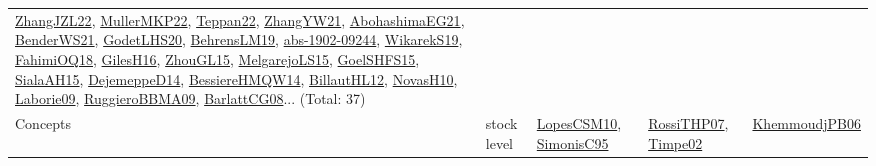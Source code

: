 {\begin{longtable}{lp{3cm}>{\raggedright}p{6cm}>{\raggedright}p{6cm}p{8cm}}
\href{papers/ZhangJZL22.pdf}{ZhangJZL22}\cite{ZhangJZL22}, \href{articles/MullerMKP22.pdf}{MullerMKP22}\cite{MullerMKP22}, \href{papers/Teppan22.pdf}{Teppan22}\cite{Teppan22}, \href{articles/ZhangYW21.pdf}{ZhangYW21}\cite{ZhangYW21}, \href{articles/AbohashimaEG21.pdf}{AbohashimaEG21}\cite{AbohashimaEG21}, \href{papers/BenderWS21.pdf}{BenderWS21}\cite{BenderWS21}, \href{papers/GodetLHS20.pdf}{GodetLHS20}\cite{GodetLHS20}, \href{papers/BehrensLM19.pdf}{BehrensLM19}\cite{BehrensLM19}, \href{articles/abs-1902-09244.pdf}{abs-1902-09244}\cite{abs-1902-09244}, \href{articles/WikarekS19.pdf}{WikarekS19}\cite{WikarekS19}, \href{articles/FahimiOQ18.pdf}{FahimiOQ18}\cite{FahimiOQ18}, \href{papers/GilesH16.pdf}{GilesH16}\cite{GilesH16}, \href{papers/ZhouGL15.pdf}{ZhouGL15}\cite{ZhouGL15}, \href{papers/MelgarejoLS15.pdf}{MelgarejoLS15}\cite{MelgarejoLS15}, \href{articles/GoelSHFS15.pdf}{GoelSHFS15}\cite{GoelSHFS15}, \href{papers/SialaAH15.pdf}{SialaAH15}\cite{SialaAH15}, \href{papers/DejemeppeD14.pdf}{DejemeppeD14}\cite{DejemeppeD14}, \href{papers/BessiereHMQW14.pdf}{BessiereHMQW14}\cite{BessiereHMQW14}, \href{papers/BillautHL12.pdf}{BillautHL12}\cite{BillautHL12}, \href{articles/NovasH10.pdf}{NovasH10}\cite{NovasH10}, \href{papers/Laborie09.pdf}{Laborie09}\cite{Laborie09}, \href{articles/RuggieroBBMA09.pdf}{RuggieroBBMA09}\cite{RuggieroBBMA09}, \href{papers/BarlattCG08.pdf}{BarlattCG08}\cite{BarlattCG08}... (Total: 37)\\
Concepts & stock level & \href{articles/LopesCSM10.pdf}{LopesCSM10}\cite{LopesCSM10}, \href{papers/SimonisC95.pdf}{SimonisC95}\cite{SimonisC95} & \href{papers/RossiTHP07.pdf}{RossiTHP07}\cite{RossiTHP07}, \href{articles/Timpe02.pdf}{Timpe02}\cite{Timpe02} & \href{papers/KhemmoudjPB06.pdf}{KhemmoudjPB06}\cite{KhemmoudjPB06}\\

\end{longtable}}
